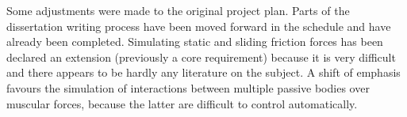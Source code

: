 \documentclass{article}
\begin{document}
Some adjustments were made to the original project plan. Parts of the dissertation writing process
have been moved forward in the schedule and have already been completed. Simulating static and
sliding friction forces has been declared an extension (previously a core requirement) because it
is very difficult and there appears to be hardly any literature on the subject. A shift of
emphasis favours the simulation of interactions between multiple passive bodies over muscular
forces, because the latter are difficult to control automatically.
\end{document}
